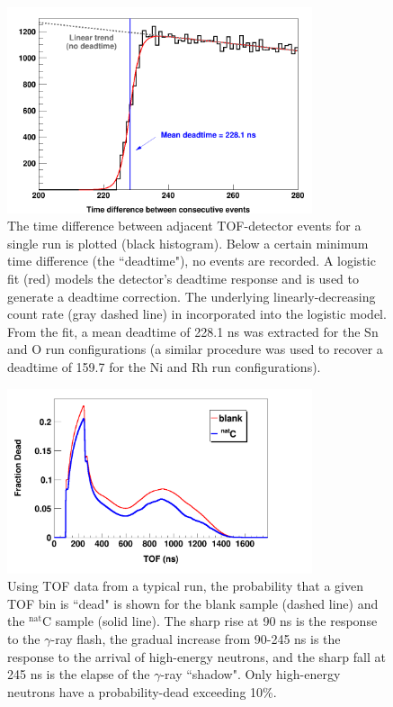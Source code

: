 \begin{figure}[h]
    \centering
    \includegraphics[width=0.8\textwidth]{figures/TimeDifferenceBetweenEvents.png}
    \caption[The time difference between consecutive events in the time-of-flight detector]
    {The time difference between adjacent TOF-detector
    events for a single run is plotted (black histogram). Below a certain
minimum time difference (the ``deadtime"), no events are recorded. A logistic
fit (red) models the detector's deadtime response and is used to generate a
deadtime correction. The underlying linearly-decreasing count rate (gray dashed
line) in incorporated into the logistic model. From the fit, a mean deadtime of
228.1 ns was extracted for the Sn and O run configurations (a similar
procedure was used to recover a deadtime of 159.7 for the Ni and Rh
run configurations).}
    \label{TimeDifferenceBetweenEvents}
\end{figure}

\begin{figure}[h]
    \centering
    \includegraphics[width=0.8\textwidth]{figures/exampleDeadtimeSpectrum.png}
    \caption[Digitizer busy probability as a function of time within micropulse]
    {Using TOF data from a typical run, the probability that a given 
        TOF bin is ``dead" is shown for the blank sample (dashed line) and the 
        $^{\text{nat}}$C   
        sample (solid line). The sharp rise at 90 ns is the response to the
        $\gamma$-ray flash, the gradual increase from 90-245 ns is the response to
        the arrival of high-energy neutrons, and the sharp fall at 245 ns
        is the elapse of the $\gamma$-ray ``shadow". Only high-energy neutrons
        have a probability-dead exceeding 10\%.}
    \label{ExampleDeadtimeSpectrum}
\end{figure}


